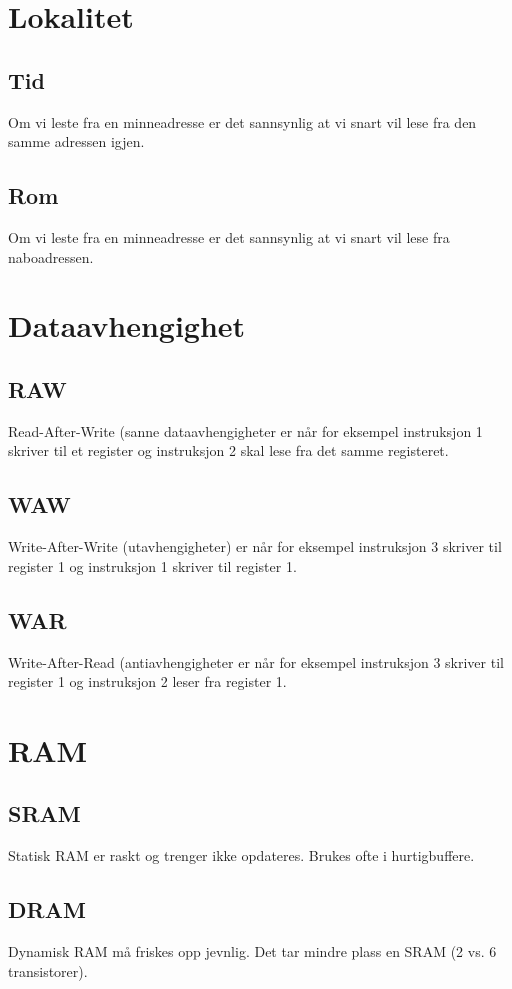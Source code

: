 \documentclass[a4paper, 10pt]{article}
\begin{document}
\section{Lokalitet}
\subsection{Tid}
Om vi leste fra en minneadresse er det sannsynlig at vi snart vil lese fra den samme adressen igjen.

\subsection{Rom}
Om vi leste fra en minneadresse er det sannsynlig at vi snart vil lese fra naboadressen.

\section{Dataavhengighet}
\subsection{RAW}
Read-After-Write (sanne dataavhengigheter er når for eksempel instruksjon 1 skriver til et register og instruksjon 2 skal lese fra det samme registeret.

\subsection{WAW}
Write-After-Write (utavhengigheter) er når for eksempel instruksjon 3 skriver til register 1 og instruksjon 1 skriver til register 1.

\subsection{WAR}
Write-After-Read (antiavhengigheter er når for eksempel instruksjon 3 skriver til register 1 og instruksjon 2 leser fra register 1.



\section{RAM}
\subsection{SRAM}
Statisk RAM er raskt og trenger ikke opdateres. Brukes ofte i hurtigbuffere.

\subsection{DRAM}
Dynamisk RAM må friskes opp jevnlig. Det tar mindre plass en SRAM (2 vs. 6 transistorer).
\end{document}
